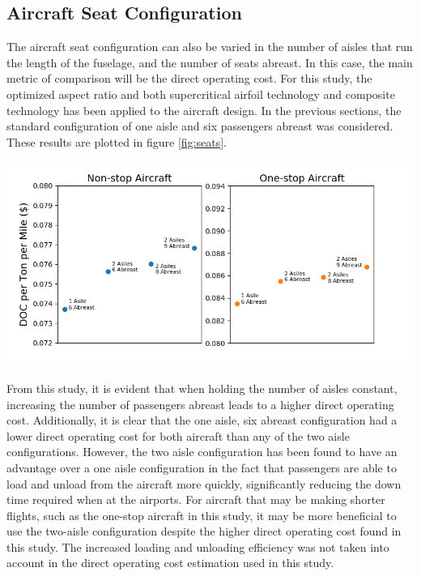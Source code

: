 \documentclass{article}
\begin{document}
    \subsection{Aircraft Seat Configuration}
    \label{sec:seat configuration}
        \begin{flushleft}
            The aircraft seat configuration can also be varied in the number of
            aisles that run the length of the fuselage, and the number of seats
            abreast. In this case, the main metric of comparison will be the
            direct operating cost. For this study, the optimized aspect ratio
            and both supercritical airfoil technology and composite technology
            has been applied to the aircraft design. In the previous sections, the
            standard configuration of one aisle and six passengers abreast
            was considered. These results are plotted in figure \ref{fig:seats}.
        \end{flushleft}

        \begin{center}
            \includegraphics[scale=0.7]{seating.PNG}
            \label{fig:seats}
        \end{center}

        \begin{flushleft}
            From this study, it is evident that when holding the number of
            aisles constant, increasing the number of passengers abreast leads
            to a higher direct operating cost. Additionally, it is clear that the
            one aisle, six abreast configuration had a lower direct operating
            cost for both aircraft than any of the two aisle configurations.
            However, the two aisle configuration has been found to have an
            advantage over a one aisle configuration in the fact that passengers
            are able to load and unload from the aircraft more quickly,
            significantly reducing the down time required when at the airports.
            For aircraft that may be making shorter flights, such as the
            one-stop aircraft in this study, it may be more beneficial to use
            the two-aisle configuration despite the higher direct operating cost
            found in this study. The increased loading and unloading efficiency
            was not taken into account in the direct operating cost estimation
            used in this study.
        \end{flushleft}
\end{document}
